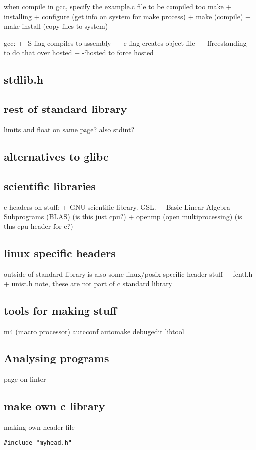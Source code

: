 when compile in gcc, specify the example.c file to be compiled too
make
+ installing
+ configure (get info on system for make process)
+ make (compile)
+ make install (copy files to system)

gcc:
+ -S flag compiles to assembly
+ -c flag creates object file
+ -ffreestanding to do that over hosted
+ -fhosted to force hosted
\subsection{stdlib.h}

\subsection{rest of standard library}

limits and float on same page? also stdint?
\subsection{alternatives to glibc}
\subsection{scientific libraries}
c headers on stuff:
+ GNU scientific library. GSL.
+ Basic Linear Algebra Subprograms (BLAS) (is this just cpu?)
+ openmp (open multiprocessing) (is this cpu header for c?)
\subsection{linux specific headers}
outside of standard library is also some linux/posix specific header stuff
+ fcntl.h
+ unist.h
note, these are not part of c standard library
\subsection{tools for making stuff}
m4 (macro processor)
autoconf
automake
debugedit
libtool
\subsection{Analysing programs}
page on linter
\subsection{make own c library}
making own header file
\begin{verbatim}
#include "myhead.h"
\end{verbatim}


